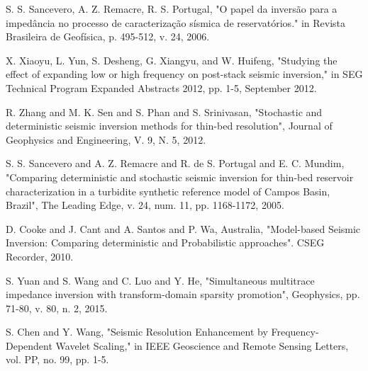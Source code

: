 \documentclass[journal]{IEEEtran}
\begin{document}
\begin{thebibliography}{1}
S. S. Sancevero, A. Z. Remacre, R. S. Portugal, "O papel da inversão para a impedância no processo de caracterização sísmica de reservatórios." in Revista Brasileira de Geofísica, p. 495-512, v. 24, 2006.

X. Xiaoyu, L. Yun, S. Desheng, G. Xiangyu, and W. Huifeng, "Studying the effect of expanding low or high frequency on post-stack seismic inversion," in SEG Technical Program Expanded Abstracts 2012, pp. 1-5, September 2012.

R. Zhang and M. K. Sen and S. Phan and S. Srinivasan, "Stochastic and deterministic seismic inversion methods for thin-bed resolution", Journal of Geophysics and Engineering, V. 9, N. 5, 2012.

S. S. Sancevero and A. Z. Remacre and R. de S. Portugal and E. C. Mundim, "Comparing deterministic and stochastic seismic inversion for thin-bed reservoir characterization in a turbidite synthetic reference model of Campos Basin, Brazil", The Leading Edge, v. 24, num. 11, pp. 1168-1172, 2005. 

D. Cooke and J. Cant and A. Santos and  P. Wa, Australia,  "Model-based Seismic Inversion: Comparing deterministic and Probabilistic approaches". CSEG Recorder, 2010. 

S. Yuan and S. Wang and C. Luo and Y. He, "Simultaneous multitrace impedance inversion with transform-domain sparsity promotion", Geophysics, pp. 71-80, v. 80, n. 2, 2015.

S. Chen and Y. Wang, "Seismic Resolution Enhancement by Frequency-Dependent Wavelet Scaling," in IEEE Geoscience and Remote Sensing Letters, vol. PP, no. 99, pp. 1-5.





\end{thebibliography}
\end{document}
